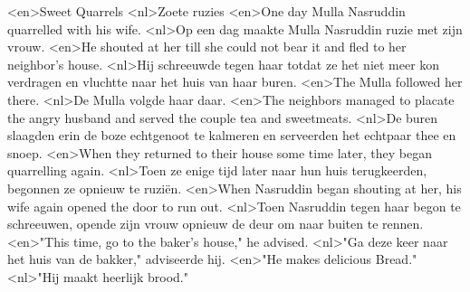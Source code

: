 <en>Sweet Quarrels
<nl>Zoete ruzies
<en>One day Mulla Nasruddin quarrelled with his wife.
<nl>Op een dag maakte Mulla Nasruddin ruzie met zijn vrouw.
<en>He shouted at her till she could not bear it and fled to her neighbor’s house.
<nl>Hij schreeuwde tegen haar totdat ze het niet meer kon verdragen en vluchtte naar het huis van haar buren.
<en>The Mulla followed her there.
<nl>De Mulla volgde haar daar.
<en>The neighbors managed to placate the angry husband and served the couple tea and sweetmeats.
<nl>De buren slaagden erin de boze echtgenoot te kalmeren en serveerden het echtpaar thee en snoep.
<en>When they returned to their house some time later, they began quarrelling again.
<nl>Toen ze enige tijd later naar hun huis terugkeerden, begonnen ze opnieuw te ruziën.
<en>When Nasruddin began shouting at her, his wife again opened the door to run out.
<nl>Toen Nasruddin tegen haar begon te schreeuwen, opende zijn vrouw opnieuw de deur om naar buiten te rennen.
<en>"This time, go to the baker's house," he advised.
<nl>"Ga deze keer naar het huis van de bakker," adviseerde hij.
<en>"He makes delicious  Bread."
<nl>"Hij maakt heerlijk brood."
